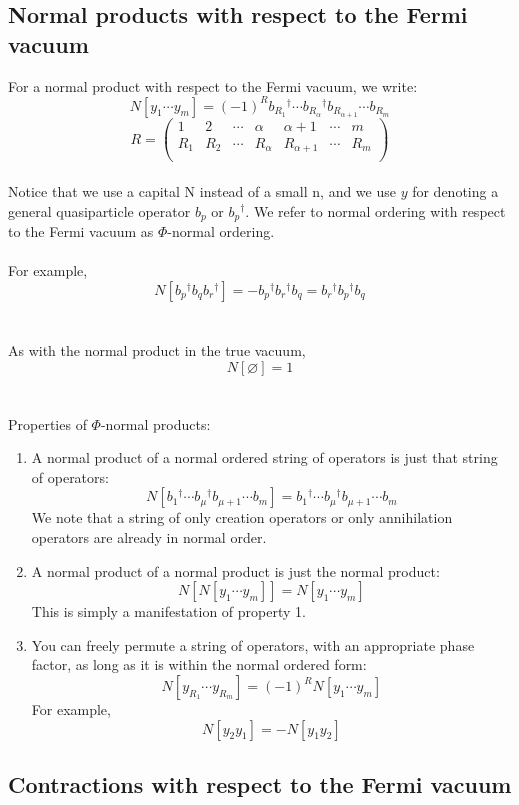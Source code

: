 \documentclass{article}
\newcommand{\dg}{\ensuremath{^\dagger} }
\newcommand{\cd}{\ensuremath{\cdots} }
\begin{document}
\subsection{Normal products with respect to the Fermi vacuum }
For a normal product with respect to the Fermi vacuum, we write: 
\[N[y_1 \cd y_m]= (-1)^R b_{R_1}\dg \cd b_{R_\alpha}\dg b_{R_{\alpha+1}} \cd b_{R_m} \]
\[
R = 
\begin{pmatrix}
1 & 2 &\cd & \alpha & \alpha+1 & \cd & m  \\
R_1 & R_2 &\cd & R_\alpha& R_{\alpha+1} & \cd & R_m  \\
\end{pmatrix}
\] \\
Notice that we use a capital N instead of a small n, and we use $y$ for denoting a general quasiparticle operator $b_p$ or $b_p\dg$. 
We refer to normal ordering with respect to the Fermi vacuum as $\Phi$-normal ordering. 
\\ \\
For example,
\[N[b_p\dg b_q b_r\dg] = -b_p\dg b_r\dg b_q = b_r\dg b_p\dg b_q\]
\\ \\
As with the normal product in the true vacuum, 
\[N[\varnothing] = 1\]
\\ \\
Properties of $\Phi$-normal products: 
\begin{enumerate}
\item A normal product of a normal ordered string of operators is just that string of operators:
\[N[b_{1}\dg \cd b_{\mu}\dg b_{\mu+1} \cd b_{m} ] = b_{1}\dg \cd b_{\mu}\dg b_{{\mu+1}} \cd b_{m}  \]
We note that a string of only creation operators or only annihilation operators are already in normal order.
\item A normal product of a normal product is just the normal product:
\[N[N[y_1 \cd y_m]] = N[y_1 \cd y_m] \]
This is simply a manifestation of property 1.
\item You can freely permute a string of operators, with an appropriate phase factor, as long as it is within the normal ordered form:
\[N[y_{R_1} \cd y_{R_m} ] = (-1)^R N[ y_1 \cd y_m]\]
For example,
\[N[y_2 y_1] = -N[y_1 y_2] \]
\end{enumerate}

\subsection{Contractions with respect to the Fermi vacuum }
\end{document}

